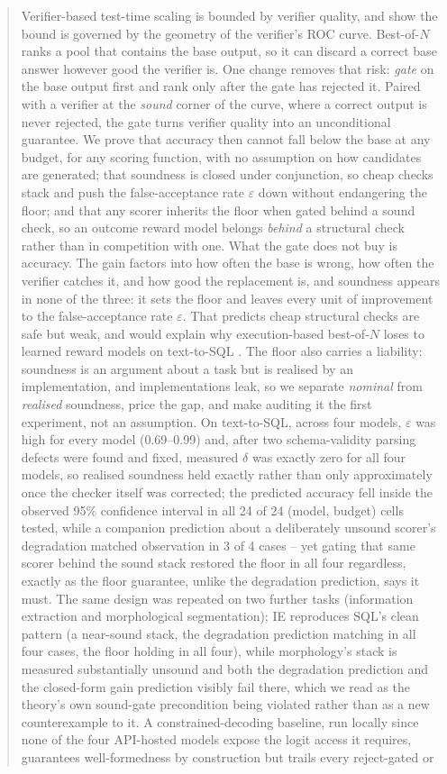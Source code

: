 \documentclass[11pt]{article}
\begin{document}
\begin{abstract}
Verifier-based test-time scaling is bounded by verifier quality, and \citet{dorner2025rocnreroll} show the bound is governed by the geometry of the verifier's ROC curve. Best-of-$N$ ranks a pool that contains the base output, so it can discard a correct base answer however good the verifier is. One change removes that risk: \emph{gate} on the base output first and rank only after the gate has rejected it. Paired with a verifier at the \emph{sound} corner of the curve, where a correct output is never rejected, the gate turns verifier quality into an unconditional guarantee. We prove that accuracy then cannot fall below the base at any budget, for any scoring function, with no assumption on how candidates are generated; that soundness is closed under conjunction, so cheap checks stack and push the false-acceptance rate $\varepsilon$ down without endangering the floor; and that any scorer inherits the floor when gated behind a sound check, so an outcome reward model belongs \emph{behind} a structural check rather than in competition with one. What the gate does not buy is accuracy. The gain factors into how often the base is wrong, how often the verifier catches it, and how good the replacement is, and soundness appears in none of the three: it sets the floor and leaves every unit of improvement to the false-acceptance rate $\varepsilon$. That predicts cheap structural checks are safe but weak, and would explain why execution-based best-of-$N$ loses to learned reward models on text-to-SQL \citep{gradesql2026}. The floor also carries a liability: soundness is an argument about a task but is realised by an implementation, and implementations leak, so we separate \emph{nominal} from \emph{realised} soundness, price the gap, and make auditing it the first experiment, not an assumption. On text-to-SQL, across four models, $\varepsilon$ was high for every model (0.69--0.99) and, after two schema-validity parsing defects were found and fixed, measured $\delta$ was exactly zero for all four models, so realised soundness held exactly rather than only approximately once the checker itself was corrected; the predicted accuracy fell inside the observed 95\% confidence interval in all 24 of 24 (model, budget) cells tested, while a companion prediction about a deliberately unsound scorer's degradation matched observation in 3 of 4 cases -- yet gating that same scorer behind the sound stack restored the floor in all four regardless, exactly as the floor guarantee, unlike the degradation prediction, says it must. The same design was repeated on two further tasks (information extraction and morphological segmentation); IE reproduces SQL's clean pattern (a near-sound stack, the degradation prediction matching in all four cases, the floor holding in all four), while morphology's stack is measured substantially unsound and both the degradation prediction and the closed-form gain prediction visibly fail there, which we read as the theory's own sound-gate precondition being violated rather than as a new counterexample to it. A constrained-decoding baseline, run locally since none of the four API-hosted models expose the logit access it requires, guarantees well-formedness by construction but trails every reject-gated or 
\end{abstract}
\end{document}
